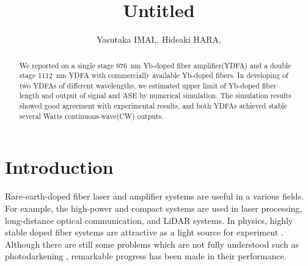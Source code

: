\documentclass{osa-article}
\begin{document}
\title{Untitled}

\author{Yasutaka IMAI,, Hideaki HARA,}

\address{Reserch Institute for Interdisciplinary Science, Okayama University, Okayama, Japan}

\begin{abstract}
We reported on a single stage \SI{976}{nm} Yb-doped fiber amplifier(YDFA) and a double stage \SI{1112}{nm} YDFA with commercially available Yb-doped fibers.
In developing of two YDFAs of different wavelengths, we estimated upper limit of Yb-doped fiber length and output of signal and ASE by numerical simulation.
The simulation results showed good agreement with experimental results, and both YDFAs achieved stable several Watts continuous-wave(CW) outputs.
\end{abstract}

\listoftodos
\section{Introduction}
Rare-earth-doped fiber laser and amplifier systems are useful in a various fields.
For example, the high-power and compact systems are used in laser processing, long-distance optical communication, and LiDAR systems.
In physics, highly stable doped fiber systems are attractive as a light source for experiment \cite{burkley2017Yb, coluccelli2016Optical}.
Although there are still some problems which are not fully understood such as photodarkening \cite{paschotta1997Lifetime}, remarkable progress has been made in their performance.
\end{document}
